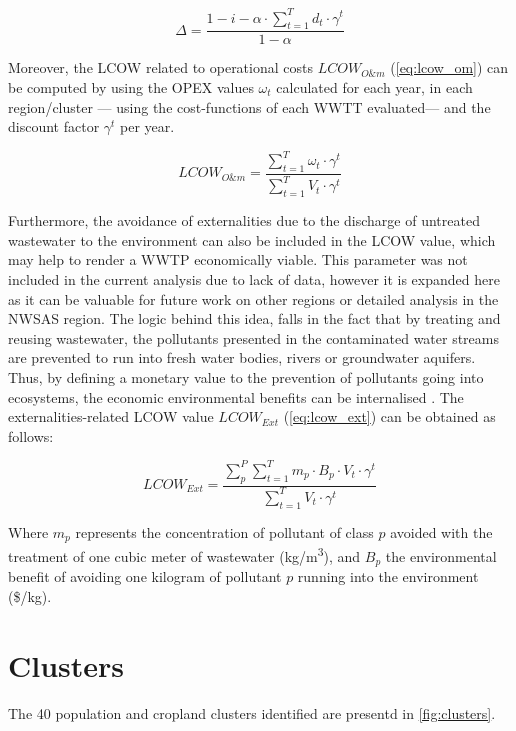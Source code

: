 \documentclass[12pt]{iopart}
\begin{document}
\begin{equation}\label{eq:delta}
\Delta = \frac{1 - i - \alpha\cdot\sum_{t=1}^{T}d_{t}\cdot\gamma^{t}}{1 - \alpha}
\end{equation}

Moreover, the LCOW related to operational costs $LCOW_{O\&m}$ (\autoref{eq:lcow_om}) can be computed by using the OPEX values $\omega_{t}$ calculated for each year, in each region/cluster --- using the cost-functions of each WWTT evaluated--- and the discount factor $\gamma^t$ per year.

\begin{equation}\label{eq:lcow_om}
LCOW_{O\&m} = \frac{\sum_{t=1}^{T} \omega_{t}\cdot\gamma^{t}}{\sum_{t=1}^{T} V_{t}\cdot\gamma^{t}}
\end{equation}

Furthermore, the avoidance of externalities due to the discharge of untreated wastewater to the environment can also be included in the LCOW value, which may help to render a WWTP economically viable. This parameter was not included in the current analysis due to lack of data, however it is expanded here as it can be valuable for future work on other regions or detailed analysis in the NWSAS region. The logic behind this idea, falls in the fact that by treating and reusing wastewater, the pollutants presented in the contaminated water streams are prevented to run into fresh water bodies, rivers or groundwater aquifers. Thus, by  defining a monetary value to the prevention of pollutants going into ecosystems, the economic environmental benefits can be internalised \cite{Assessmentwastewatertreatment2012}. The externalities-related LCOW value $LCOW_{Ext}$ (\autoref{eq:lcow_ext}) can be obtained as follows:

\begin{equation}\label{eq:lcow_ext}
LCOW_{Ext} = \frac{\sum_{p}^{P}\sum_{t=1}^{T} m_{p}\cdot B_p\cdot V_{t}\cdot\gamma^{t}}{\sum_{t=1}^{T} V_{t}\cdot\gamma^{t}}
\end{equation}

Where $m_p$ represents the concentration of pollutant of class $p$ avoided with the treatment of one cubic meter of wastewater (kg/m\textsuperscript{3}), and $B_p$ the environmental benefit of avoiding one kilogram of pollutant $p$ running into the environment (\$/kg).

\section{Clusters}
The 40 population and cropland clusters identified are presentd in \autoref{fig:clusters}. 
\end{document}
